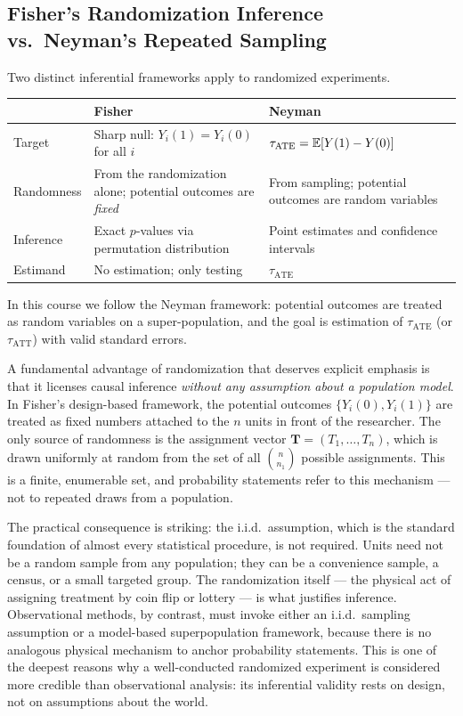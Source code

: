 \documentclass[master.tex]{subfiles}
\begin{document}
\subsection{Fisher's Randomization Inference vs.\ Neyman's Repeated Sampling}

Two distinct inferential frameworks apply to randomized experiments.

\medskip
\renewcommand{\arraystretch}{1.4}
\begin{tabular}{p{2.8cm} p{5.5cm} p{5.5cm}}
\toprule
& \textbf{Fisher} & \textbf{Neyman} \\
\midrule
Target
  & Sharp null: $Y_i(1) = Y_i(0)$ for all $i$
  & $\tau_{\mathrm{ATE}} = \mathbb{E}[Y(1) - Y(0)]$ \\
Randomness
  & From the randomization alone;
    potential outcomes are \emph{fixed}
  & From sampling; potential outcomes are random variables \\
Inference
  & Exact $p$-values via permutation distribution
  & Point estimates and confidence intervals \\
Estimand
  & No estimation; only testing
  & $\tau_{\mathrm{ATE}}$ \\
\bottomrule
\end{tabular}
\renewcommand{\arraystretch}{1}
\medskip

In this course we follow the Neyman framework: potential outcomes are
treated as random variables on a super-population, and the goal is
estimation of $\tau_{\mathrm{ATE}}$ (or $\tau_{\mathrm{ATT}}$) with
valid standard errors.

\begin{remark}
\label{w5:rem:finite-pop}
A fundamental advantage of randomization that deserves explicit emphasis
is that it licenses causal inference \emph{without any assumption about
a population model}.  In Fisher's design-based framework, the
potential outcomes $\{Y_i(0), Y_i(1)\}$ are treated as fixed numbers
attached to the $n$ units in front of the researcher.  The only source
of randomness is the assignment vector $\mathbf{T} = (T_1,\ldots,T_n)$,
which is drawn uniformly at random from the set of all
$\binom{n}{n_1}$ possible assignments.  This is a finite, enumerable
set, and probability statements refer to this mechanism --- not to
repeated draws from a population.

The practical consequence is striking: the i.i.d.\ assumption, which
is the standard foundation of almost every statistical procedure, is
not required.  Units need not be a random sample from any population;
they can be a convenience sample, a census, or a small targeted group.
The randomization itself --- the physical act of assigning treatment by
coin flip or lottery --- is what justifies inference.  Observational
methods, by contrast, must invoke either an i.i.d.\ sampling assumption
or a model-based superpopulation framework, because there is no
analogous physical mechanism to anchor probability statements.  This is
one of the deepest reasons why a well-conducted randomized experiment
is considered more credible than observational analysis: its inferential
validity rests on design, not on assumptions about the world.
\end{remark}
\end{document}
